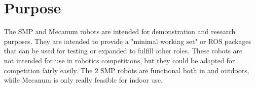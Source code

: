 
\chapter{Purpose}
\label{chap:purpose}

The SMP and Mecanum robots are intended for demonstration and research purposes. They are intended to provide a "minimal working set" or ROS packages that can be used for testing or expanded to fulfill other roles. These robots are not intended for use in robotics competitions, but they could be adapted for competition fairly easily. The 2 SMP robots are functional both in and outdoors, while Mecanum is only really feasible for indoor use.
